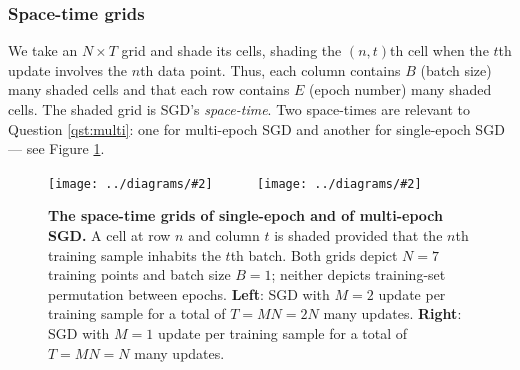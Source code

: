 \documentclass[anon,12pt]{colt2021} %
\newcommand{\dmoo}[2]{\texttt{[image: ../diagrams/\#2]}}
\begin{document}
        \subsubsection{Space-time grids}
            We take an $N\times T$ grid and shade its cells, shading the
            $(n,t)$th cell when the $t$th update involves the $n$th data point.
            Thus, each column contains $B$ (batch size) many shaded cells and
            that each row contains $E$ (epoch number) many shaded cells.
            The shaded grid is SGD's \emph{space-time}.
            Two space-times are relevant to Question \ref{qst:multi}: one for
            multi-epoch SGD and another for single-epoch SGD --- see Figure
            \ref{fig:spacetimes-epoch}.
            \begin{figure}[h!] 
                \centering
                \dmoo{3.55cm}{spacetime-b1-e2-nosh}
                ~~~~~
                \dmoo{3.55cm}{spacetime-b1-e1-nosh}
                \caption{
                    \textbf{The space-time grids of single-epoch and of
                    multi-epoch SGD.}  A cell at row $n$ and column $t$ is
                    shaded provided that the $n$th training sample inhabits the
                    $t$th batch.  Both grids depict $N=7$
                    training points and batch size $B=1$; neither
                    depicts training-set permutation between epochs.
                    \newline
                    \textbf{Left}:
                        SGD with $M=2$ update per training sample for a total
                        of $T = MN = 2N$ many updates.
                    \newline
                    \textbf{Right}:
                        SGD with $M=1$ update per training sample for a total
                        of $T = MN = N$ many updates.
                }
                \label{fig:spacetimes-epoch}
            \end{figure}

        \newpage
\end{document}
